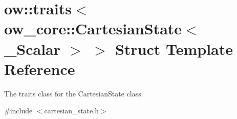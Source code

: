\hypertarget{structow_1_1traits_3_01ow__core_1_1CartesianState_3_01__Scalar_01_4_01_4}{}\section{ow\+:\+:traits$<$ ow\+\_\+core\+:\+:Cartesian\+State$<$ \+\_\+\+Scalar $>$ $>$ Struct Template Reference}
\label{structow_1_1traits_3_01ow__core_1_1CartesianState_3_01__Scalar_01_4_01_4}


The traits class for the Cartesian\+State class.  




{\ttfamily \#include $<$cartesian\+\_\+state.\+h$>$}

